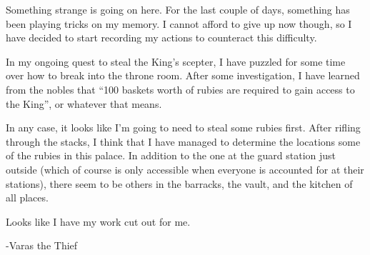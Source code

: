 \documentclass[white]{grimrock}
\begin{document}
\name{\wArchives{}}

Something strange is going on here. For the last couple of days, something has been playing tricks on my memory. I cannot afford to give up now though, so I have decided to start recording my actions to counteract this difficulty.

In my ongoing quest to steal the King’s scepter, I have puzzled for some time over how to break into the throne room. After some investigation, I have learned from the nobles that “100 baskets worth of rubies are required to gain access to the King”, or whatever that means.

In any case, it looks like I’m going to need to steal some rubies first. After rifling through the stacks, I think that I have managed to determine the locations some of the rubies in this palace. In addition to the one at the guard station just outside (which of course is only accessible when everyone is accounted for at their stations), there seem to be others in the barracks, the vault, and the kitchen of all places.

Looks like I have my work cut out for me.

								-Varas the Thief
\end{document}
